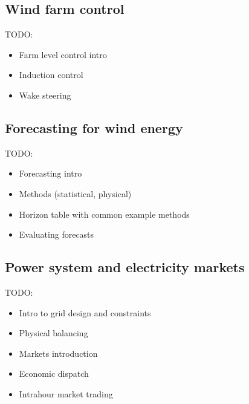 \clearpage
\subsection{Wind farm control}
\label{sec:intro_control}

TODO:
\begin{itemize}
\color{red}
    \item Farm level control intro
    \item Induction control
    \item Wake steering
\end{itemize}

\clearpage
\subsection{Forecasting for wind energy}
\label{sec:intro_forecasting}

TODO:
\begin{itemize}
\color{red}
    \item Forecasting intro
    \item Methods (statistical, physical)
    \item Horizon table with common example methods
    \item Evaluating forecasts
\end{itemize}


\clearpage
\subsection{Power system and electricity markets}
\label{sec:intro_power_markets}

TODO:
\begin{itemize}
\color{red}
    \item Intro to grid design and constraints
    \item Physical balancing
    \item Markets introduction
    \item Economic dispatch
    \item Intrahour market trading
\end{itemize}

